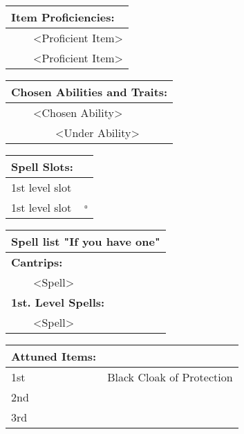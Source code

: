 \documentclass[11pt]{article}
\newcommand{\done}{\rlap{$\square$}{\raisebox{2pt}{\large\hspace{1pt}\ding{51}}}}
\newcommand{\available}{$\square$}
\newcommand{\tabitem}{~~\llap{--}~~}
\newcommand{\tabtabitem}{~~~~~~\llap{$\bullet$}~~}
\begin{document}
\begin{multicols}{2}
\vspace{4mm}

\noindent \begin{tabularx}{\linewidth}{@{}l}
{\Large \textbf{Item Proficiencies:}} \\
\hline
\tabitem <Proficient Item> \\
\tabitem <Proficient Item>
		\end{tabularx}

\vspace{4mm}

\noindent \begin{tabularx}{\linewidth}{@{}l}
{\Large \textbf{Chosen Abilities and Traits:}} \\
\hline
\tabitem <Chosen Ability> \\
\tabtabitem <Under Ability>
		\end{tabularx}

\vspace{4mm}

\noindent \begin{tabularx}{\linewidth}{@{}l c}
{\Large \textbf{Spell Slots:}} \\
\hline
1st level slot & \done \\
1st level slot & \available
		\end{tabularx}

\vspace{4mm}

\noindent \begin{tabularx}{\linewidth}{@{}l}
{\Large \textbf{Spell list "If you have one"}} 			\\
\hline
\textbf{Cantrips:}	 					\\
\tabitem <Spell>						\\

\textbf{1st. Level Spells:}				\\
\tabitem <Spell>
		\end{tabularx}

\vspace{4mm}

\noindent \begin{tabularx}{95mm}{@{}l l}
{\Large \textbf{Attuned Items:}} & \\
\hline
1st \dotfill & Black Cloak of Protection \\
2nd &  \\
3rd & 
		\end{tabularx}
	\end{multicols}

\clearpage
\end{document}
